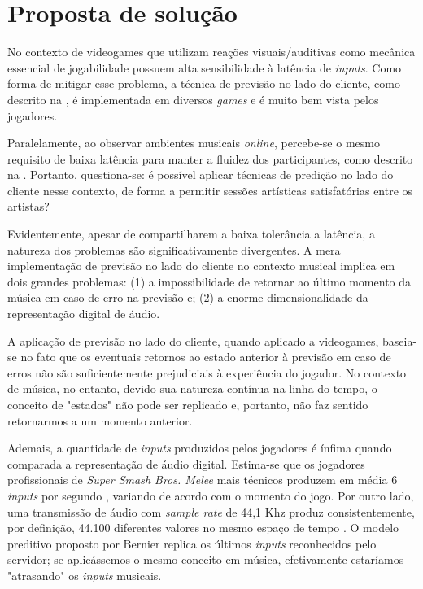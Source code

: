 \chapter{Proposta de solução}

No contexto de videogames que utilizam reações visuais/auditivas como mecânica essencial de jogabilidade possuem alta sensibilidade à latência de \textit{inputs}. Como forma de mitigar esse problema, a técnica de previsão no lado do cliente, como descrito na , é implementada em diversos \textit{games} e é muito bem vista pelos jogadores.

Paralelamente, ao observar ambientes musicais \textit{online}, percebe-se o mesmo requisito de baixa latência para manter a fluidez dos participantes, como descrito na . Portanto, questiona-se: é possível aplicar técnicas de predição no lado do cliente nesse contexto, de forma a permitir sessões artísticas satisfatórias entre os artistas?

Evidentemente, apesar de compartilharem a baixa tolerância a latência, a natureza dos problemas são significativamente divergentes. A mera implementação de previsão no lado do cliente no contexto musical implica em dois grandes problemas: (1) a impossibilidade de retornar ao último momento da música em caso de erro na previsão e; (2) a enorme dimensionalidade da representação digital de áudio.

A aplicação de previsão no lado do cliente, quando aplicado a videogames, baseia-se no fato que os eventuais retornos ao estado anterior à previsão em caso de erros não são suficientemente prejudiciais à experiência do jogador. No contexto de música, no entanto, devido sua natureza contínua na linha do tempo, o conceito de "estados" não pode ser replicado e, portanto, não faz sentido retornarmos a um momento anterior.
 
Ademais, a quantidade de \textit{inputs} produzidos pelos jogadores é ínfima quando comparada a representação de áudio digital. Estima-se que os jogadores profissionais de \textit{Super Smash Bros. Melee} mais técnicos produzem em média 6 \textit{inputs} por segundo \cite{melee_inputs_per_second}, variando de acordo com o momento do jogo. Por outro lado, uma transmissão de áudio com \textit{sample rate} de 44,1 Khz produz consistentemente, por definição, 44.100 diferentes valores no mesmo espaço de tempo \cite{jukebox_dimension}. O modelo preditivo proposto por Bernier \cite{client-side-prediction} replica os últimos \textit{inputs} reconhecidos pelo servidor; se aplicássemos o mesmo conceito em música, efetivamente estaríamos "atrasando" os \textit{inputs} musicais.


